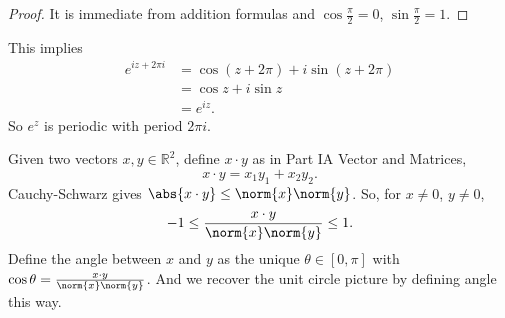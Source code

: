 \begin{proof}
    It is immediate from addition formulas and \(\cos \frac{\pi}{2} = 0\), \(\sin \frac{\pi}{2} = 1\).
\end{proof}
This implies
\begin{align*}
    e^{iz + 2\pi i} &= \cos(z + 2\pi) + i \sin(z + 2\pi)\\
    &= \cos z + i \sin z\\
    &= e^{iz}.
\end{align*}
So \(e^z\) is periodic with period \(2\pi i\).
\begin{remark}
    Given two vectors \(x, y \in \mathbb{R}^2\), define \(x \cdot y\) as in Part IA Vector and Matrices,
    \[
        x \cdot y = x_1 y_1 + x_2 y_2.
    \]
    Cauchy-Schwarz gives \(\abs{x\cdot y} \leq \norm{x}\norm{y}\). So, for \(x \neq 0\), \(y \neq 0\),
    \[
        -1 \leq \frac{x\cdot y}{\norm{x}\norm{y}}\leq 1.
    \]
    Define the angle between \(x\) and \(y\) as the unique \(\theta \in [0, \pi]\) with \(\cos \theta = \frac{x \cdot y}{\norm{x}\norm{y}}\). And we recover the unit circle picture by defining angle this way.
\end{remark}